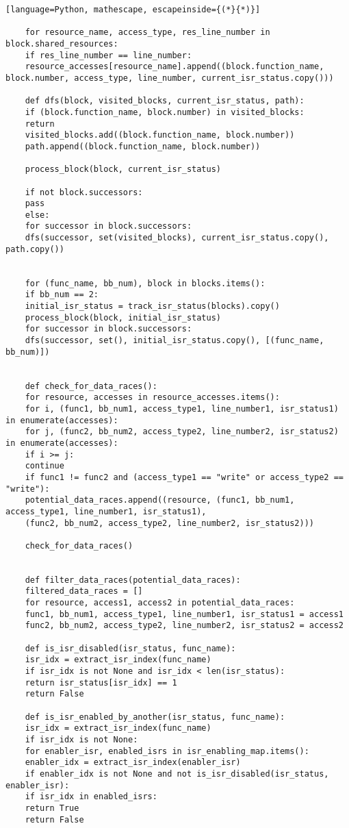 \documentclass[
fancyheadings, %
%
%
]{stsreprt}
\begin{document}
{\begin{lstlisting}[language=Python, mathescape, escapeinside={(*}{*)}]
	
	for resource_name, access_type, res_line_number in block.shared_resources:
	if res_line_number == line_number:
	resource_accesses[resource_name].append((block.function_name, block.number, access_type, line_number, current_isr_status.copy()))
	
	def dfs(block, visited_blocks, current_isr_status, path):
	if (block.function_name, block.number) in visited_blocks:
	return
	visited_blocks.add((block.function_name, block.number))
	path.append((block.function_name, block.number))
	
	process_block(block, current_isr_status)
	
	if not block.successors:
	pass
	else:
	for successor in block.successors:
	dfs(successor, set(visited_blocks), current_isr_status.copy(), path.copy())
	
	
	for (func_name, bb_num), block in blocks.items():
	if bb_num == 2:  
	initial_isr_status = track_isr_status(blocks).copy()
	process_block(block, initial_isr_status)
	for successor in block.successors:
	dfs(successor, set(), initial_isr_status.copy(), [(func_name, bb_num)])
	
	
	def check_for_data_races():
	for resource, accesses in resource_accesses.items():
	for i, (func1, bb_num1, access_type1, line_number1, isr_status1) in enumerate(accesses):
	for j, (func2, bb_num2, access_type2, line_number2, isr_status2) in enumerate(accesses):
	if i >= j:
	continue  
	if func1 != func2 and (access_type1 == "write" or access_type2 == "write"):
	potential_data_races.append((resource, (func1, bb_num1, access_type1, line_number1, isr_status1),
	(func2, bb_num2, access_type2, line_number2, isr_status2)))
	
	check_for_data_races()
	
	
	def filter_data_races(potential_data_races):
	filtered_data_races = []
	for resource, access1, access2 in potential_data_races:
	func1, bb_num1, access_type1, line_number1, isr_status1 = access1
	func2, bb_num2, access_type2, line_number2, isr_status2 = access2
	
	def is_isr_disabled(isr_status, func_name):
	isr_idx = extract_isr_index(func_name)
	if isr_idx is not None and isr_idx < len(isr_status):
	return isr_status[isr_idx] == 1
	return False
	
	def is_isr_enabled_by_another(isr_status, func_name):
	isr_idx = extract_isr_index(func_name)
	if isr_idx is not None:
	for enabler_isr, enabled_isrs in isr_enabling_map.items():
	enabler_idx = extract_isr_index(enabler_isr)
	if enabler_idx is not None and not is_isr_disabled(isr_status, enabler_isr):
	if isr_idx in enabled_isrs:
	return True
	return False
	

\end{lstlisting}}
\end{document}
